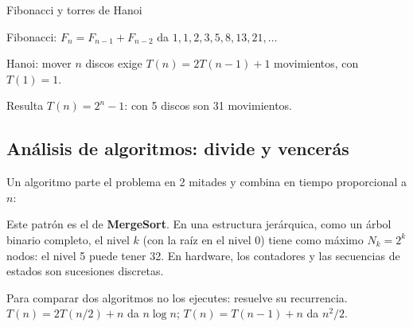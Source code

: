 \begin{tmejemplo}{Fibonacci y torres de Hanoi}
\begin{tmpasos}
\item Fibonacci: $F_n=F_{n-1}+F_{n-2}$ da $1, 1, 2, 3, 5, 8, 13, 21,\dots$
\item Hanoi: mover $n$ discos exige $T(n)=2T(n-1)+1$ movimientos, con $T(1)=1$.
\item Resulta $T(n)=2^n-1$: con 5 discos son 31 movimientos.
\end{tmpasos}
\end{tmejemplo}

\subsection{An\'alisis de algoritmos: divide y vencer\'as}
Un algoritmo parte el problema en 2 mitades y combina en tiempo proporcional a $n$:

\begin{center}
\end{center}

\begin{tmsistemas}
Este patr\'on es el de \textbf{MergeSort}. En una estructura jer\'arquica, como un \'arbol binario completo, el nivel $k$ (con la ra\'iz en el nivel 0) tiene como m\'aximo $N_k=2^k$ nodos: el nivel 5 puede tener 32. En hardware, los contadores y las secuencias de estados son sucesiones discretas.
\end{tmsistemas}

\begin{tmtip}Para comparar dos algoritmos no los ejecutes: resuelve su recurrencia. $T(n)=2T(n/2)+n$ da $n\log n$; $T(n)=T(n-1)+n$ da $n^2/2$.\end{tmtip}

